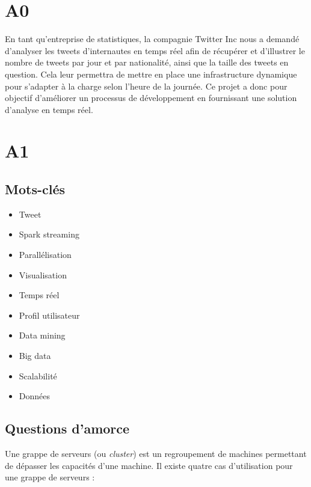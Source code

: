 \section{A0}
  En tant qu'entreprise de statistiques, la compagnie Twitter Inc nous a demandé d'analyser les tweets d'internautes en temps réel afin de récupérer et d'illustrer le nombre de tweets par jour et par nationalité, ainsi que la taille des tweets en question. Cela leur permettra de mettre en place une infrastructure dynamique pour s'adapter à la charge selon l'heure de la journée. Ce projet a donc pour objectif d'améliorer un processus de développement en fournissant une solution d'analyse en temps réel.

\section{A1}
  \subsection{Mots-clés}
  \label{sub:Mots-clés}

    \begin{itemize}
      \item Tweet
      \item Spark streaming
      \item Parallélisation
      \item Visualisation
      \item Temps réel
      \item Profil utilisateur
      \item Data mining
      \item Big data
      \item Scalabilité
      \item Données
    \end{itemize}

  \subsection{Questions d'amorce}
  \label{sub:Questions d'amorce}

    Une grappe de serveurs (ou \textit{cluster}) est un regroupement de machines permettant de dépasser les capacités d'une machine. Il existe quatre cas d'utilisation pour une grappe de serveurs : \\

